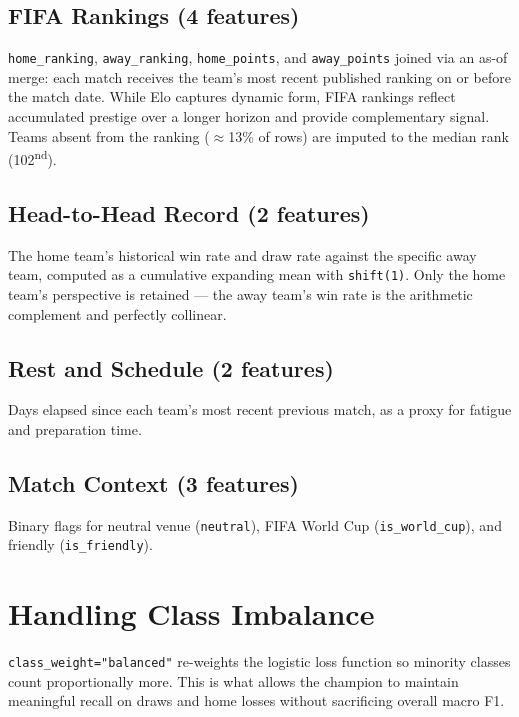 \documentclass[12pt,a4paper,openany]{report}
\begin{document}
\subsection{FIFA Rankings (4 features)}

\texttt{home\_ranking}, \texttt{away\_ranking}, \texttt{home\_points}, and \texttt{away\_points} joined via
an as-of merge: each match receives the team's most recent published ranking
on or before the match date. While Elo captures dynamic form, FIFA rankings
reflect accumulated prestige over a longer horizon and provide complementary
signal. Teams absent from the ranking ($\approx$13\% of rows) are imputed to the median
rank (102\textsuperscript{nd}).

\subsection{Head-to-Head Record (2 features)}

The home team's historical win rate and draw rate against the specific away
team, computed as a cumulative expanding mean with \texttt{shift(1)}. Only the home
team's perspective is retained --- the away team's win rate is the arithmetic
complement and perfectly collinear.

\subsection{Rest and Schedule (2 features)}

Days elapsed since each team's most recent previous match, as a proxy for
fatigue and preparation time.

\subsection{Match Context (3 features)}

Binary flags for neutral venue (\texttt{neutral}), FIFA World Cup (\texttt{is\_world\_cup}),
and friendly (\texttt{is\_friendly}).

\section{Handling Class Imbalance}

\texttt{class\_weight="balanced"} re-weights the logistic loss function so minority
classes count proportionally more. This is what allows the champion to
maintain meaningful recall on draws and home losses without sacrificing overall
macro F1.
\end{document}
